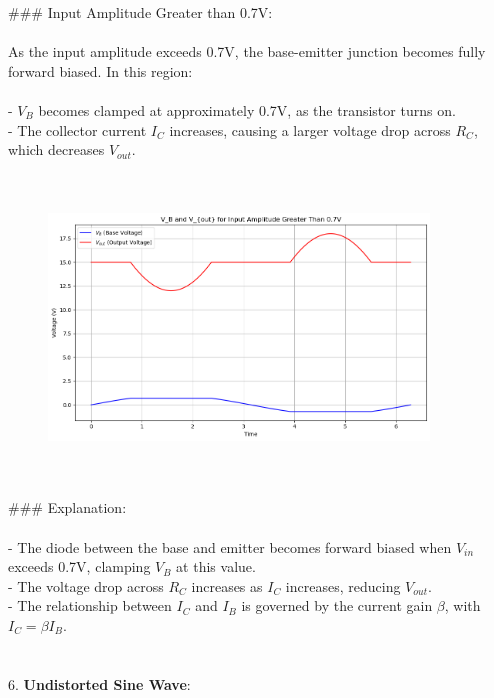 \documentclass{article}
\begin{document}
### Input Amplitude Greater than 0.7V: \\ \\ 
As the input amplitude exceeds 0.7V, the base-emitter junction becomes fully forward biased. In this region: \\ \\
- \( V_B \) becomes clamped at approximately 0.7V, as the transistor turns on. \\ 
- The collector current \( I_C \) increases, causing a larger voltage drop across \( R_C \), which decreases \( V_{out} \). \\
\\ \\ 

\begin{figure}[H]
    \centering
    \includegraphics[width=0.9\textwidth]{./img/Lab5_5_Above.png}
    \caption{}
    \label{fig:graph1} 
\end{figure}
\\ \\ 

### Explanation: \\ \\
- The diode between the base and emitter becomes forward biased when \( V_{in} \) exceeds 0.7V, clamping \( V_B \) at this value. \\ 
- The voltage drop across \( R_C \) increases as \( I_C \) increases, reducing \( V_{out} \). \\ 
- The relationship between \( I_C \) and \( I_B \) is governed by the current gain \( \beta \), with \( I_C = \beta I_B \). \\ 

\\ \\ 
6. \textbf{Undistorted Sine Wave}:
\\ \\ 
\end{document}
